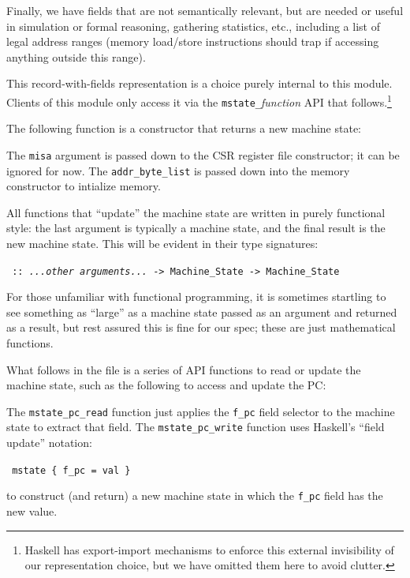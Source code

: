 \documentclass[11pt]{article}
\newcommand{\hmm}{\hspace*{2em}}
\begin{document}
Finally, we have fields that are not semantically relevant, but are
needed or useful in simulation or formal reasoning, gathering
statistics, etc., including a list of legal address ranges (memory
load/store instructions should trap if accessing anything outside this
range).

This record-with-fields representation is a choice purely internal to
this module.  Clients of this module only access it via the
\verb|mstate_|{\it{}function} API that follows.\footnote{Haskell has
export-import mechanisms to enforce this external invisibility of our
representation choice, but we have omitted them here to avoid
clutter.}

The following function is a constructor that returns a new machine state:



The \verb|misa| argument is passed down to the CSR register file
constructor; it can be ignored for now.  The \verb|addr_byte_list| is
passed down into the memory constructor to intialize memory.

All functions that ``update'' the machine state are written in purely
functional style: the last argument is typically a machine state, and
the final result is the new machine state.  This will be evident in
their type signatures:

\begin{tabbing}\tt
\hmm {\it somefunction} :: {\it ...other arguments...} -> Machine\_State -> Machine\_State
\end{tabbing}

For those unfamiliar with functional programming, it is sometimes
startling to see something as ``large'' as a machine state passed as
an argument and returned as a result, but rest assured this is fine
for our spec; these are just mathematical functions.

What follows in the file is a series of API functions to read or
update the machine state, such as the following to access and update
the PC:



The \verb|mstate_pc_read| function just applies the \verb|f_pc| field
selector to the machine state to extract that field.  The
\verb|mstate_pc_write| function uses Haskell's ``field update''
notation:

\begin{tabbing}\tt
\hmm \verb|mstate { f_pc = val }|
\end{tabbing}
to construct (and return) a new machine state in which the \verb|f_pc|
field has the new value.
\end{document}
